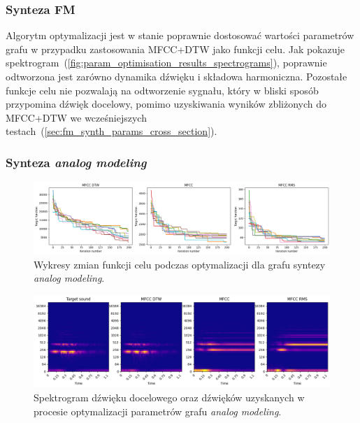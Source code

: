 \subsubsection{Synteza FM}

Algorytm optymalizacji jest w stanie poprawnie dostosować wartości parametrów grafu w przypadku
zastosowania MFCC+DTW jako funkcji celu. Jak pokazuje spektrogram~(\ref{fig:param_optimisation_results_spectrograms}),
poprawnie odtworzona jest zarówno dynamika dźwięku i składowa harmoniczna. Pozostałe funkcje celu nie pozwalają
na odtworzenie sygnału, który w bliski sposób przypomina dźwięk docelowy, pomimo uzyskiwania wyników zbliżonych
do MFCC+DTW we wcześniejszych testach~(\ref{sec:fm_synth_params_cross_section}).

\subsubsection{Synteza \textit{analog modeling}}

\begin{figure}[H]
    \centering
    \includegraphics[width=1.0\linewidth]{rys03/am_training_results.png}
    \caption{
      Wykresy zmian funkcji celu podczas optymalizacji dla grafu syntezy \textit{analog modeling}.
    }\label{fig:am_target_fun_plots}
\end{figure}

\begin{figure}[H]
    \centering
    \includegraphics[width=1.0\linewidth]{rys03/spectro_results_am.png}
    \caption{
      Spektrogram dźwięku docelowego oraz dźwięków uzyskanych w procesie
      optymalizacji parametrów grafu \textit{analog modeling}.
    }\label{fig:am_param_optimisation_results_spectrograms}
\end{figure}

